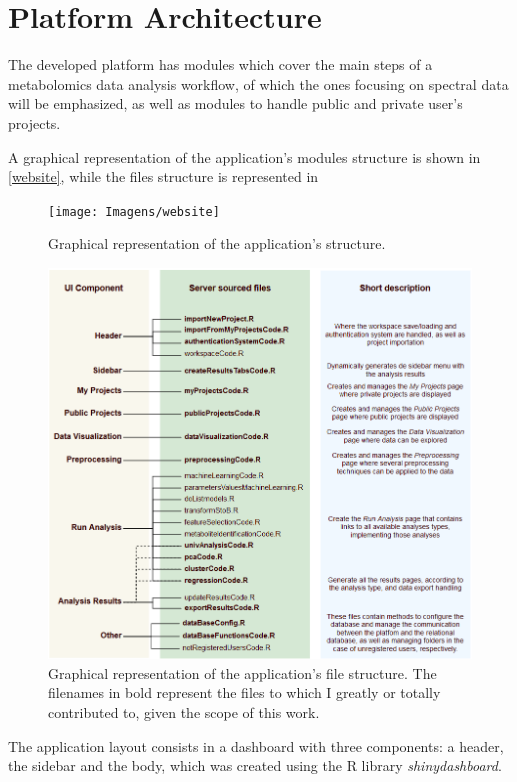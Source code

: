
\section{Platform Architecture}

The developed platform has modules which cover the main steps of a metabolomics data analysis workflow, of which the ones focusing on spectral data will be emphasized, as well as modules to handle public and private user's projects. 

A graphical representation of the application's modules structure is shown in \autoref{website}, while the files structure is represented in 

\begin{figure}[h]
	\centering
	\texttt{[image: Imagens/website]}
	\caption{Graphical representation of the application's structure.}
	\label{website}
\end{figure}

\begin{figure}[h]
	\centering
	\includegraphics[width=1\linewidth]{Imagens/file_structure}
	\caption{Graphical representation of the application's file structure. The filenames in bold represent the files to which I greatly or totally contributed to, given the scope of this work.}
	\label{file_structure}
\end{figure}

The application layout consists in a dashboard with three components: a header, the sidebar and the body, which was created using the R library \textit{shinydashboard}. 

